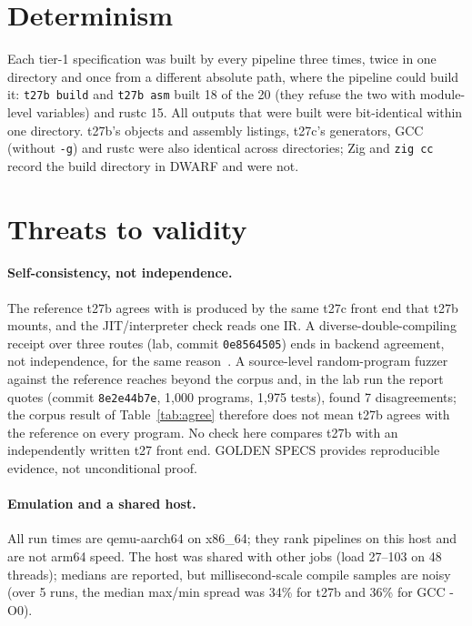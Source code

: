 \documentclass[11pt,a4paper]{article}
\begin{document}
\section{Determinism}
\label{sec:determinism}

Each tier-1 specification was built by every pipeline three times, twice
in one directory and once from a different absolute path, where the
pipeline could build it: \texttt{t27b build} and \texttt{t27b asm} built 18
of the 20 (they refuse the two with module-level variables) and rustc 15.
All outputs that were built were bit-identical within one directory. t27b's objects and assembly
listings, t27c's generators, GCC (without \texttt{-g}) and rustc were also
identical across directories; Zig and \texttt{zig cc} record the build
directory in DWARF and were not.

\section{Threats to validity}
\label{sec:threats}

\paragraph{Self-consistency, not independence.}
The reference t27b agrees with is produced by the same t27c front end
that t27b mounts, and the JIT/interpreter check reads one IR. A
diverse-double-compiling receipt over three routes (lab, commit
\texttt{0e8564505}) ends in backend agreement, not independence, for the
same reason~\cite{wheeler}. A source-level random-program fuzzer against
the reference reaches beyond the corpus and, in the lab run the report
quotes (commit \texttt{8e2e44b7e}, 1,000 programs, 1,975 tests), found 7
disagreements; the corpus result of Table~\ref{tab:agree} therefore does
not mean t27b agrees with the reference on every program. No check here compares t27b with an independently written
t27 front end. GOLDEN SPECS provides reproducible evidence, not
unconditional proof.

\paragraph{Emulation and a shared host.}
All run times are qemu-aarch64 on x86\_64; they rank pipelines on this
host and are not arm64 speed. The host was shared with other jobs (load
27--103 on 48 threads); medians are reported, but millisecond-scale
compile samples are noisy (over 5 runs, the median max/min spread was
34\% for t27b and 36\% for GCC -O0).
\end{document}
